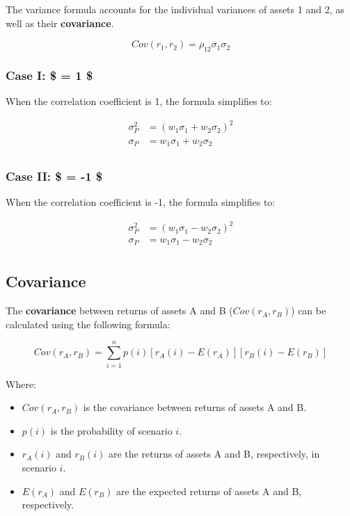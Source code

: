 \documentclass[
]{book}
\providecommand{\tightlist}{%
  \setlength{\itemsep}{0pt}\setlength{\parskip}{0pt}}
\begin{document}
The variance formula accounts for the individual variances of assets 1 and 2, as well as their \textbf{covariance}.

\[Cov(r_1,r_2 )=\rho_{12} 𝜎_1 𝜎_2\]

\hypertarget{case-i-1}{%
\subsubsection{\texorpdfstring{Case I: \$ \rho = 1 \$}{Case I: \$ = 1 \$}}\label{case-i-1}}

When the correlation coefficient is 1, the formula simplifies to:

\[
\begin{aligned}
\sigma_P^2 &= (w_1 \sigma_1 + w_2 \sigma_2)^2 \\
\sigma_P  &= w_1 \sigma_1 + w_2 \sigma_2 \\
\end{aligned}
\]

\hypertarget{case-ii--1}{%
\subsubsection{\texorpdfstring{Case II: \$ \rho = -1 \$}{Case II: \$ = -1 \$}}\label{case-ii--1}}

When the correlation coefficient is -1, the formula simplifies to:

\[
\begin{aligned}
\sigma_P^2 &= (w_1 \sigma_1 - w_2 \sigma_2)^2 \\
\sigma_P  &= w_1 \sigma_1 - w_2 \sigma_2 \\
\end{aligned}
\]

\hypertarget{covariance}{%
\subsection{Covariance}\label{covariance}}

The \textbf{covariance} between returns of assets A and B (\(Cov(r_A, r_B)\)) can be calculated using the following formula:

\[Cov(r_A, r_B) = \sum_{i=1}^{n} p(i)[r_A(i) - E(r_A)][r_B(i) - E(r_B)]\]

Where:

\begin{itemize}
\tightlist
\item
  \(Cov(r_A, r_B)\) is the covariance between returns of assets A and B.
\item
  \(p(i)\) is the probability of scenario \(i\).
\item
  \(r_A(i)\) and \(r_B(i)\) are the returns of assets A and B, respectively, in scenario \(i\).
\item
  \(E(r_A)\) and \(E(r_B)\) are the expected returns of assets A and B, respectively.
\end{itemize}
\end{document}

